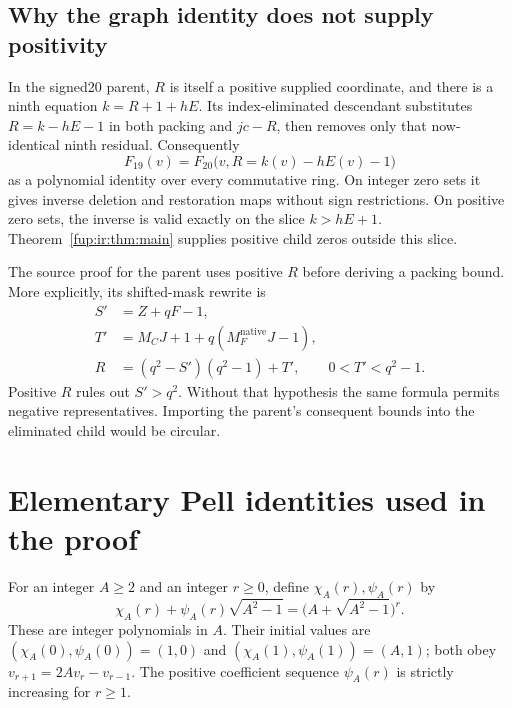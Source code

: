 \documentclass[11pt,letterpaper]{article}
\theoremstyle{definition}\newtheorem{definition}[theorem]{Definition}
\theoremstyle{remark}\newtheorem{remark}[theorem]{Remark}
\newcommand{\MFnat}{M_{F}^{\mathrm{native}}}
\newcommand{\MC}{M_C}
\begin{document}
\subsection{Why the graph identity does not supply positivity}
In the signed20 parent, $R$ is itself a positive supplied coordinate, and there is a ninth equation $k=R+1+hE$. Its index-eliminated descendant substitutes $R=k-hE-1$ in both packing and $jc-R$, then removes only that now-identical ninth residual. Consequently
\[
 F_{19}(v)=F_{20}\bigl(v,R=k(v)-hE(v)-1\bigr)
\]
as a polynomial identity over every commutative ring. On integer zero sets it gives inverse deletion and restoration maps without sign restrictions. On positive zero sets, the inverse is valid exactly on the slice $k>hE+1$. Theorem~\ref{fup:ir:thm:main} supplies positive child zeros outside this slice.

The source proof for the parent uses positive $R$ before deriving a packing bound. More explicitly, its shifted-mask rewrite is
\begin{align*}
 S'&=Z+qF-1,\\
 T'&=\MC J+1+q(\MFnat J-1),\\
 R&=(q^2-S')(q^2-1)+T',\qquad 0<T'<q^2-1.
\end{align*}
Positive $R$ rules out $S'>q^2$. Without that hypothesis the same formula permits negative representatives. Importing the parent's consequent bounds into the eliminated child would be circular.

\section{Elementary Pell identities used in the proof}\label{fup:ir:sec:pell}
For an integer $A\ge2$ and an integer $r\ge0$, define $\chi_A(r),\psi_A(r)$ by
\begin{equation}\label{fup:ir:eq:pell}
 \chi_A(r)+\psi_A(r)\sqrt{A^2-1}
   =\bigl(A+\sqrt{A^2-1}\bigr)^r.
\end{equation}
These are integer polynomials in $A$. Their initial values are $(\chi_A(0),\psi_A(0))=(1,0)$ and $(\chi_A(1),\psi_A(1))=(A,1)$; both obey $v_{r+1}=2Av_r-v_{r-1}$. The positive coefficient sequence $\psi_A(r)$ is strictly increasing for $r\ge1$.
\end{document}
